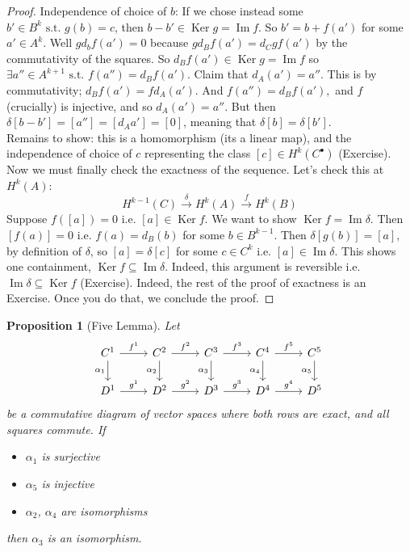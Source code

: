 \documentclass[10pt]{article}
\theoremstyle{plain}
\newtheorem{prop}[thm]{Proposition}
\theoremstyle{definition}
\newcommand{\st}{\text{ s.t. }}
\newcommand{\ie}{\text{ i.e. }}
\DeclareMathOperator{\Ker}{Ker}
\DeclareMathOperator{\Ima}{Im}
\begin{document}
\begin{proof}
Independence of choice of $b$: If we chose instead some $b'\in B^k\st g(b) = c$, then $b-b' \in \Ker g = \Ima f$. So $b' = b + f(a')$ for some $a' \in A^k$. Well $gd_b f(a') = 0 $ because $g d_B f(a') = d_C g f(a')$ by the commutativity of the squares. So $d_B f(a') \in \Ker g = \Ima f$ so $\exists a'' \in A^{k+1} \st f(a'') = d_B f(a')$. Claim that $d_A(a') = a''.$ This is by commutativity; $d_B f(a') = f d_A(a')$. And $f(a'') = d_Bf(a'),$ and $f $ (crucially) is injective, and so $d_A(a') = a''$. But then $\delta [ b- b' ] = [ a''] = [d_A a'] = [ 0 ]$, meaning that $\delta[b] = \delta[b']$. \\
Remains to show: this is a homomorphism (its a linear map), and the independence of choice of $c$ representing the class $[c]\in H^k(C^\bullet)$ (Exercise).\\
Now we must finally check the exactness of the sequence. Let's check this at $H^k(A):$
$$H^{k-1}(C) \xrightarrow{\delta} H^k(A) \xrightarrow{f} H^k(B)$$
Suppose $f([a]) = 0$ i.e. $[a]\in\Ker f.$ We want to show $\Ker f = \Ima \delta$. Then $[f(a) ] = 0 \ie f(a) = d_B(b) $ for some $b\in B^{k-1}.$ Then $\delta[g(b)] = [a]$, by definition of $\delta$, so $[a] = \delta [c] $ for some $c\in C^k \ie [a]\in \Ima \delta$. This shows one containment, $\Ker f \subseteq \Ima \delta$. Indeed, this argument is reversible i.e. $\Ima \delta \subseteq \Ker f$ (Exercise). Indeed, the rest of the proof of exactness is an Exercise. Once you do that, we conclude the proof.
\end{proof}
\begin{prop}[Five Lemma]\label{prop:fivelemma} Let
$$%
\begin{tikzcd}
C^1 \arrow[r, "f^1"] \arrow[d, "\alpha_1"'] & C^2 \arrow[r, "f^2"] \arrow[d, "\alpha_2"'] & C^3 \arrow[r, "f^3"] \arrow[d, "\alpha_3"'] & C^4 \arrow[r, "f^5"] \arrow[d, "\alpha_4"'] & C^5 \arrow[d, "\alpha_5"'] \\
D^1 \arrow[r, "g^1"]                        & D^2 \arrow[r, "g^2"]                        & D^3 \arrow[r, "g^3"]                        & D^4 \arrow[r, "g^4"]                        & D^5                       
\end{tikzcd}$$
be a commutative diagram of vector spaces where both rows are exact, and all squares commute. If 
\begin{itemize}
    \item $\alpha_1$ is surjective
    \item $\alpha_5$ is injective
    \item $\alpha_2$, $\alpha_4$ are isomorphisms
\end{itemize} then $\alpha_3$ is an isomorphism.
\end{prop}
\end{document}
